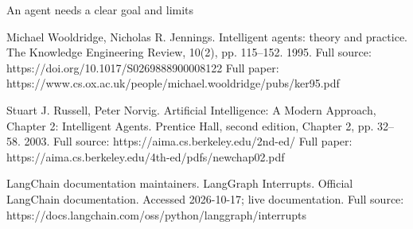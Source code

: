 \begin{frame}[t]{An agent needs a clear goal and limits}
{Michael Wooldridge, Nicholas R. Jennings. Intelligent agents: theory and practice. The Knowledge Engineering Review, 10(2), pp. 115--152. 1995.
Full source: https://doi.org/10.1017/S0269888900008122
Full paper: https://www.cs.ox.ac.uk/people/michael.wooldridge/pubs/ker95.pdf

Stuart J. Russell, Peter Norvig. Artificial Intelligence: A Modern Approach, Chapter 2: Intelligent Agents. Prentice Hall, second edition, Chapter 2, pp. 32--58. 2003.
Full source: https://aima.cs.berkeley.edu/2nd-ed/
Full paper: https://aima.cs.berkeley.edu/4th-ed/pdfs/newchap02.pdf

LangChain documentation maintainers. LangGraph Interrupts. Official LangChain documentation. Accessed 2026-10-17; live documentation.
Full source: https://docs.langchain.com/oss/python/langgraph/interrupts}
\end{frame}

